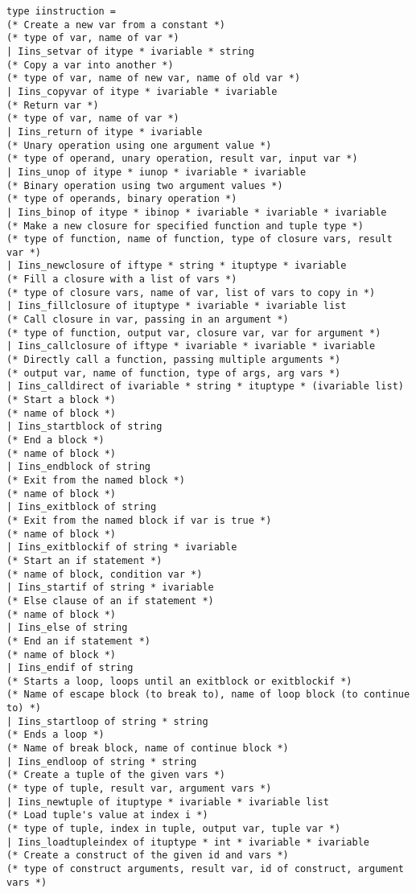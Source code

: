 \documentclass[12pt,twoside,notitlepage]{report}
\begin{document}
\begin{verbatim}
type iinstruction =
(* Create a new var from a constant *)
(* type of var, name of var *)
| Iins_setvar of itype * ivariable * string
(* Copy a var into another *)
(* type of var, name of new var, name of old var *)
| Iins_copyvar of itype * ivariable * ivariable
(* Return var *)
(* type of var, name of var *)
| Iins_return of itype * ivariable
(* Unary operation using one argument value *)
(* type of operand, unary operation, result var, input var *)
| Iins_unop of itype * iunop * ivariable * ivariable
(* Binary operation using two argument values *)
(* type of operands, binary operation *)
| Iins_binop of itype * ibinop * ivariable * ivariable * ivariable
(* Make a new closure for specified function and tuple type *)
(* type of function, name of function, type of closure vars, result var *)
| Iins_newclosure of iftype * string * ituptype * ivariable
(* Fill a closure with a list of vars *)
(* type of closure vars, name of var, list of vars to copy in *)
| Iins_fillclosure of ituptype * ivariable * ivariable list
(* Call closure in var, passing in an argument *)
(* type of function, output var, closure var, var for argument *)
| Iins_callclosure of iftype * ivariable * ivariable * ivariable
(* Directly call a function, passing multiple arguments *)
(* output var, name of function, type of args, arg vars *)
| Iins_calldirect of ivariable * string * ituptype * (ivariable list)
(* Start a block *)
(* name of block *)
| Iins_startblock of string
(* End a block *)
(* name of block *)
| Iins_endblock of string
(* Exit from the named block *)
(* name of block *)
| Iins_exitblock of string
(* Exit from the named block if var is true *)
(* name of block *)
| Iins_exitblockif of string * ivariable
(* Start an if statement *)
(* name of block, condition var *)
| Iins_startif of string * ivariable
(* Else clause of an if statement *)
(* name of block *)
| Iins_else of string
(* End an if statement *)
(* name of block *)
| Iins_endif of string
(* Starts a loop, loops until an exitblock or exitblockif *)
(* Name of escape block (to break to), name of loop block (to continue to) *)
| Iins_startloop of string * string
(* Ends a loop *)
(* Name of break block, name of continue block *)
| Iins_endloop of string * string
(* Create a tuple of the given vars *)
(* type of tuple, result var, argument vars *)
| Iins_newtuple of ituptype * ivariable * ivariable list
(* Load tuple's value at index i *)
(* type of tuple, index in tuple, output var, tuple var *)
| Iins_loadtupleindex of ituptype * int * ivariable * ivariable
(* Create a construct of the given id and vars *)
(* type of construct arguments, result var, id of construct, argument vars *)

\end{verbatim}
\end{document}

